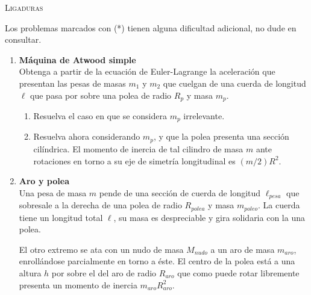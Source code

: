 \documentclass[11pt, spanish, a4paper, twoside]{article}
\begin{document}
\begin{center}
  \textsc{\large Ligaduras}
\end{center}

\noindent
Los problemas marcados con (*) tienen alguna dificultad adicional, no dude en consultar.
\begin{enumerate}


\item 
	\begin{minipage}[t][1.2cm]{0.7\textwidth}
		\textbf{Máquina de Atwood simple}\\
		Obtenga a partir de la ecuación de Euler-Lagrange la aceleración que presentan las pesas de masas \(m_1\) y \(m_2\) que cuelgan de una cuerda de longitud \(\ell\) que pasa por sobre una polea de radio \(R_p\) y masa \(m_p\).
	\end{minipage}
	\begin{minipage}[c][2cm][t]{0.2\textwidth}
		
	\end{minipage}
	\begin{enumerate}
		\item Resuelva el caso en que se considera \(m_p\) irrelevante.
		\item Resuelva ahora considerando \(m_p\), y que la polea presenta una sección cilíndrica.
			El momento de inercia de tal cilindro de masa \(m\) ante rotaciones en torno a su eje de simetría longitudinal es \((m/2) R^2\).
	\end{enumerate}


\item 
	\begin{minipage}[t][3.5cm]{0.8\textwidth}
		\textbf{Aro y polea}\\
		Una pesa de masa \(m\) pende de una sección de cuerda de longitud \(\ell_{pesa}\) que sobresale a la derecha de una polea de radio \(R_{polea}\) y masa \(m_{poleo}\).
		La cuerda tiene un longitud total \(\ell\), su  masa es despreciable y gira solidaria con la una polea.

		El otro extremo se ata con un nudo de masa \(M_{nudo}\) a un aro de masa \(m_{aro}\), enrollándose parcialmente en torno a éste.
		El centro de la polea está a una altura \(h\) por sobre el del aro de radio \(R_{aro}\) que como puede rotar libremente presenta un momento de inercia \(m_{aro} R_{aro}^2\).
		

\end{minipage}
\end{enumerate}
\end{document}
